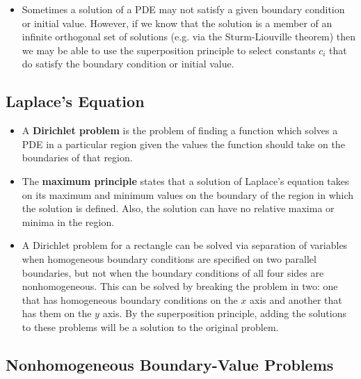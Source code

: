 \documentclass{article}
\begin{document}
\begin{itemize}
  \item Sometimes a solution of a PDE may not satisfy a given boundary condition or initial value. However, if we know that the solution is a member of an infinite orthogonal set of solutions (e.g. via the Sturm-Liouville theorem) then we may be able to use the superposition principle to select constants $c_i$ that do satisfy the boundary condition or initial value.
\end{itemize}

\setcounter{subsection}{4}
\subsection{Laplace's Equation}

\begin{itemize}
  \item A \textbf{Dirichlet problem} is the problem of finding a function which solves a PDE in a particular region given the values the function should take on the boundaries of that region.

  \item The \textbf{maximum principle} states that a solution of Laplace's equation takes on its maximum and minimum values on the boundary of the region in which the solution is defined. Also, the solution can have no relative maxima or minima in the region.

  \item A Dirichlet problem for a rectangle can be solved via separation of variables when homogeneous boundary conditions are specified on two parallel boundaries, but not when the boundary conditions of all four sides are nonhomogeneous. This can be solved by breaking the problem in two: one that has homogeneous boundary conditions on the $x$ axis and another that has them on the $y$ axis. By the superposition principle, adding the solutions to these problems will be a solution to the original problem.
\end{itemize}

\subsection{Nonhomogeneous Boundary-Value Problems}
\end{document}
